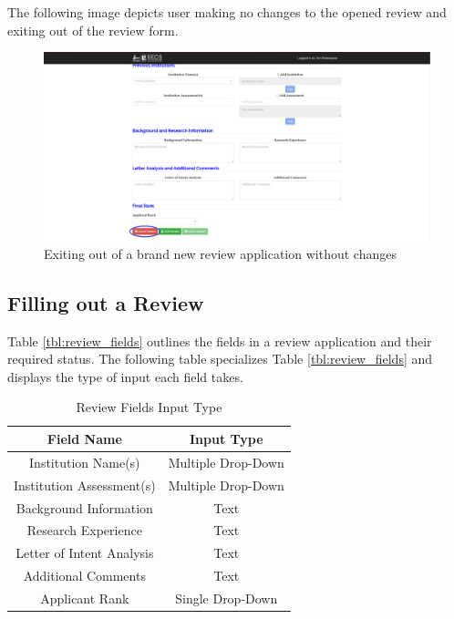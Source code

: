 \documentclass[fontsize=12pt,paper=letter,twoside]{scrartcl}
\begin{document}
\bigskip
\noindent The following image depicts user making no changes to the opened review and exiting out of the review form.

\begin{figure}[!htb]
\begin{center}
\includegraphics[width=.99\textwidth]{images/new_review_exit_wo_changes.png}
\end{center}
\caption{Exiting out of a brand new review application without changes}
\label{fig:new_review_exit_w/o_changes}
\end{figure}

\subsection{Filling out a Review}
Table \ref{tbl:review_fields} outlines the fields in a review application and their required status. The following table specializes Table \ref{tbl:review_fields} and displays the type of input each field takes.

\begin{table}[h]
\centering
\begin{tabular}{|c | c |}
	\cline{1-2}
	\textbf{Field Name} & \textbf{Input Type}\\ \hline
	Institution Name(s) & Multiple Drop-Down \\ \hline
	Institution Assessment(s) & Multiple Drop-Down \\ \hline
	Background Information & Text \\ \hline
	Research Experience & Text \\ \hline
	Letter of Intent Analysis & Text \\ \hline
	Additional Comments & Text \\ \hline
	Applicant Rank & Single Drop-Down \\ \hline
\end{tabular}
\caption {Review Fields Input Type}
\label{tbl:review_fields_input}
\end{table}
\end{document}
